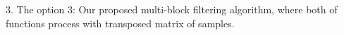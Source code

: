 
3. The option 3: Our proposed multi-block filtering algorith\-m, where both of functions process with transposed matrix of samples. 

